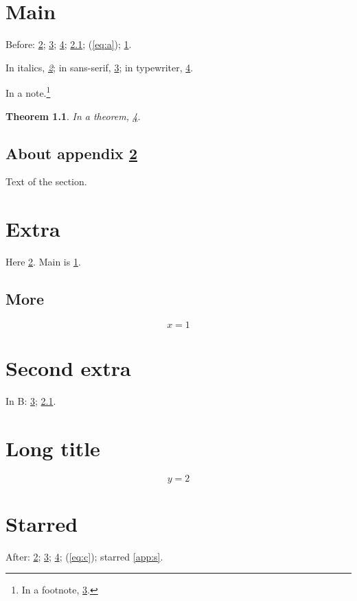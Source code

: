 \documentclass{report}
\newtheorem{theorem}{Theorem}
\begin{document}
\tableofcontents
\chapter{Main}\label{main}
Before: \ref{app:a}; \ref{app:b}; \ref{app:c}; \ref{sec:a}; (\ref{eq:a}); \ref{main}.

In italics, \emph{\ref{app:a}}; in sans-serif, \textsf{\ref{app:b}}; in typewriter, \texttt{\ref{app:c}}.

In a note.\footnote{In a footnote, \ref{app:b}.}

\begin{theorem}
In a theorem, \ref{app:c}.
\end{theorem}

\section{About appendix \ref{app:a}}
Text of the section.
\appendix
\chapter{Extra}\label{app:a}
Here \ref{app:a}. Main is \ref{main}.
\section{More}\label{sec:a}
\begin{equation}
x = 1 \label{eq:a}
\end{equation}
\chapter{Second extra}\label{app:b}
In B: \ref{app:b}; \ref{sec:a}.
\chapter[Short]{Long title}\label{app:c}
\begin{equation}
y = 2 \label{eq:c}
\end{equation}
\chapter*{Starred}\label{app:s}
After: \ref{app:a}; \ref{app:b}; \ref{app:c}; (\ref{eq:c}); starred \ref{app:s}.
\end{document}
